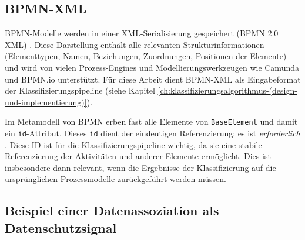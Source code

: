 \subsection*{\ac{BPMN}-XML}

\ac{BPMN}-Modelle werden in einer XML-Serialisierung gespeichert (\ac{BPMN} 2.0 XML) \cite{omgbpmn}. Diese Darstellung enthält alle relevanten Strukturinformationen (Elementtypen, Namen, Beziehungen, Zuordnungen, Positionen der Elemente) und wird von vielen Prozess-Engines und Modellierungswerkzeugen wie Camunda \cite{camunda} und BPMN.io \cite{bpmnio} unterstützt. Für diese Arbeit dient \ac{BPMN}-XML als Eingabeformat der Klassifizierungspipeline (siehe Kapitel \ref{ch:klassifizierungsalgorithmus-(design-und-implementierung)}).

Im Metamodell von \ac{BPMN} erben fast alle Elemente von \texttt{BaseElement} und damit ein \texttt{id}-Attribut. Dieses \texttt{id} dient der eindeutigen Referenzierung; es ist \emph{erforderlich} \cite{omgbpmn}. Diese ID ist für die Klassifizierungspipeline wichtig, da sie eine stabile Referenzierung der Aktivitäten und anderer Elemente ermöglicht. Dies ist insbesondere dann relevant, wenn die Ergebnisse der Klassifizierung auf die ursprünglichen Prozessmodelle zurückgeführt werden müssen.

\subsection*{Beispiel einer Datenassoziation als Datenschutzsignal}

